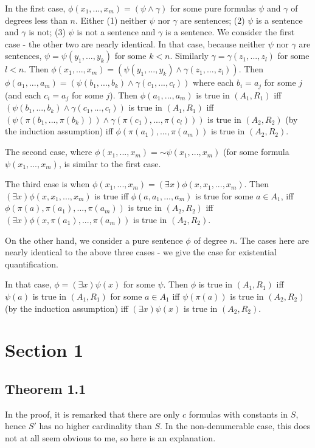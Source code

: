 \documentclass{article}
\newcommand*{\oldneg}{\mathord{\sim}}
\theoremstyle{definition}
\begin{document}
In the first case, $\phi(x_1,...,x_m)=(\psi\wedge\gamma)$ for some pure formulas 
$\psi$ and $\gamma$ of degrees less than $n$. Either (1) 
neither $\psi$ nor $\gamma$ are sentences; (2) $\psi$ is a sentence and 
$\gamma$ is not; (3) $\psi$ is not a sentence and $\gamma$ is a sentence. We consider the first 
case - the other two are nearly identical. In that case, because neither $\psi$ nor 
$\gamma$ are sentences, $\psi=\psi(y_1,...,y_k)$ for some $k<n$.
Similarly $\gamma=\gamma(z_1,...,z_l)$ for some $l<n$. Then 
$\phi(x_1,...,x_m)=(\psi(y_1,...,y_k)\wedge\gamma(z_1,...,z_l))$. Then 
$\phi(a_1,...,a_m)=(\psi(b_1,...,b_k)\wedge\gamma(c_1,...,c_l))$ where 
each $b_i=a_j$ for some $j$ (and each $c_i=a_j$ for some $j$). Then 
$\phi(a_1,...,a_m)$ is true in $(A_1,R_1)$ iff 
$(\psi(b_1,...,b_k)\wedge\gamma(c_1,...,c_l))$ is true in $(A_1,R_1)$ iff 
$(\psi(\pi(b_1,...,\pi(b_k)))\wedge\gamma(\pi(c_1),...,\pi(c_l)))$ is true in 
$(A_2,R_2)$ (by the induction assumption) iff $\phi(\pi(a_1),...,\pi(a_m))$ is true 
in $(A_2,R_2)$.

The second case, where $\phi(x_1,...,x_m)=\oldneg\psi(x_1,...,x_m)$ 
(for some formula $\psi(x_1,...,x_m)$, is similar to the first case.

The third case is when $\phi(x_1,...,x_m)=(\exists x)\phi(x,x_1,...,x_m)$. Then 
$(\exists x)\phi(x,x_1,...,x_m)$ is true iff $\phi(a,a_1,...,a_m)$ is true for some 
$a\in A_1$, iff $\phi(\pi(a),\pi(a_1),...,\pi(a_m))$ is true in $(A_2,R_2)$ iff 
$(\exists x)\phi(x,\pi(a_1),...,\pi(a_m))$ is true in $(A_2,R_2)$.

On the other hand, we consider a pure sentence $\phi$ of degree $n$. The cases here are nearly 
identical to the above three cases - we give the case for existential quantification.

In that case, $\phi=(\exists x)\psi(x)$ for some $\psi$. Then
$\phi$ is true in $(A_1,R_1)$ iff $\psi(a)$ is true in $(A_1,R_1)$ for some 
$a\in A_1$ iff $\psi(\pi(a))$ is true in $(A_2,R_2)$ (by the induction assumption) iff 
$(\exists x)\psi(x)$ is true in $(A_2,R_2)$.

\section*{Section 1}

\subsection*{Theorem 1.1}
In the proof, it is remarked that there are only $c$ formulas with constants in $S$, hence $S'$ has no higher cardinality 
than $S$. In the non-denumerable case, this does not at all seem obvious to me, so here is an explanation.
\end{document}
